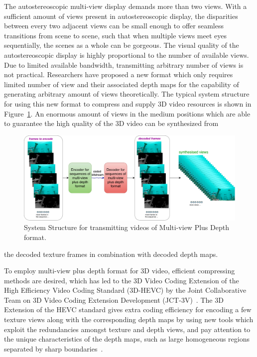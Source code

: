 The autostereoscopic multi-view display demands more than two views.
With a sufficient amount of views present in autostereoscopic display, the
disparities between every two adjacent views can be small enough to offer
seamless transitions from scene to scene, such that when multiple views
meet eyes sequentially, the scenes as a whole can be gorgeous.
The visual quality of the autostereoscopic display is highly proportional to
the number of available views.
Due to limited available bandwidth, transmitting arbitrary number of views
is not practical.
Researchers have proposed a new format which only requires limited number
of view and their associated depth maps for the capability of
generating arbitrary amount of views theoretically.
The typical system structure for using this new format to compress and supply 3D video
resources is shown in Figure~\ref{fig:SS-MVD}.
An enormous amount of views in the medium positions which are able to
guarantee the high quality of the 3D video can be synthesized from
\begin{figure}[!b]
    \centering
    \includegraphics[width=\textwidth,height=\textheight,keepaspectratio]{Figures/SystemStructureOf3DEncoder}
    \caption[System Structure for transmitting videos of Multi-view 
    Plus Depth format]{System Structure for transmitting videos of 
    Multi-view Plus Depth format.}\label{fig:SS-MVD}
\end{figure}
the decoded texture frames in combination with decoded depth maps.

To employ multi-view plus depth format for 3D video, efficient compressing
methods are desired, which has led to the 3D Video Coding Extension of the
High Efficiency Video Coding Standard (3D-HEVC) by the Joint Collaborative Team
on 3D Video Coding Extension Development (JCT-3V)~\parencite{RN195}.
The 3D Extension of the HEVC standard gives extra coding efficiency
for encoding a few texture views along with the corresponding depth maps by
using new tools which exploit the redundancies amongst
texture and depth views, and pay attention to the unique characteristics of
the depth maps, such as large homogeneous
regions separated by sharp boundaries~\parencite{RN47}.

